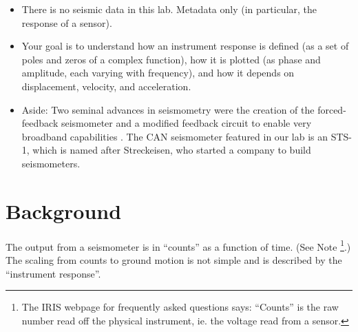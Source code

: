 \documentclass[11pt,titlepage,fleqn]{article}
\begin{document}
\begin{itemize}






\item There is no seismic data in this lab. Metadata only (in particular, the response of a sensor).


\item Your goal is to understand how an instrument response is defined (\eg as a set of poles and zeros of a complex function), how it is plotted (\eg as phase and amplitude, each varying with frequency), and how it depends on displacement, velocity, and acceleration.


\item Aside: Two seminal advances in seismometry were the creation of the forced-feedback seismometer \citep{WielandtStreckeisen1982} and a modified feedback circuit to enable very broadband capabilities \citep{WielandtSteim1986}. The CAN seismometer featured in our lab is an STS-1, which is named after Streckeisen, who started a company to build seismometers.

\end{itemize}


\section{Background}

The output from a seismometer is in ``counts'' as a function of time. (See Note \footnote{The IRIS webpage for frequently asked questions says: ``Counts'' is the raw number read off the physical instrument, ie. the voltage read from a sensor.}.) The scaling from counts to ground motion is not simple and is described by the ``instrument response''.
\end{document}
